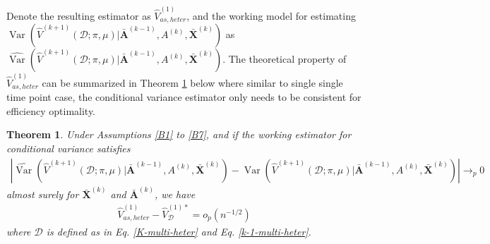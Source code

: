 \documentclass[11pt]{article}
\theoremstyle{referenceplain}
\newtheorem{theorem}{Theorem}
\theoremstyle{referencedefinition}
\theoremstyle{referenceremark}
\begin{document}
Denote the resulting estimator as $\widehat{V}_{as,heter}^{(1)}$, and the working model for estimating $\operatorname{Var}(\widehat{V}^{(k+1)}(\mathcal{D};\allowbreak\pi,\allowbreak\mu)\allowbreak|\bar{\mathbf{A}}^{(k-1)},\allowbreak A^{(k)},\allowbreak\bar{\mathbf{X}}^{(k)})$ as $\widehat{\operatorname{Var}}(\widehat{V}^{(k+1)}(\mathcal{D};\allowbreak\pi,\allowbreak\mu)\allowbreak|\bar{\mathbf{A}}^{(k-1)},\allowbreak A^{(k)},\allowbreak\bar{\mathbf{X}}^{(k)})$. The theoretical property of $\widehat{V}_{as,heter}^{(1)}$ can be summarized in Theorem \ref{thm: multi-opt-est-heter} below where similar to single single time point case, the conditional variance estimator only needs to be consistent for efficiency optimality.
\begin{theorem}\label{thm: multi-opt-est-heter}
     Under Assumptions \ref{B1} to \ref{B7}, and if the working estimator for conditional variance satisfies
    \begin{align}
        \left|\widehat{\operatorname{Var}}(\widehat{V}^{(k+1)}(\mathcal{D};\pi,\mu)|\bar{\mathbf{A}}^{(k-1)},A^{(k)},\bar{\mathbf{X}}^{(k)}) - \operatorname{Var}(\widehat{V}^{(k+1)}(\mathcal{D};\pi,\mu)|\bar{\mathbf{A}}^{(k-1)},A^{(k)},\bar{\mathbf{X}}^{(k)})\right|\to_p0
    \end{align}
   almost surely for $\bar{\mathbf{X}}^{(k)}$ and $\bar{\mathbf{A}}^{(k)}$, we have
    \begin{align}
        \widehat{V}_{as,heter}^{(1)} - \widehat{V}_{\mathcal{D}}^{(1)*}=o_p(n^{-1/2})
    \end{align}
  where $\mathcal{D}$ is defined as in Eq. \eqref{K-multi-heter} and  Eq. \eqref{k-1-multi-heter}.
\end{theorem}
\end{document}
